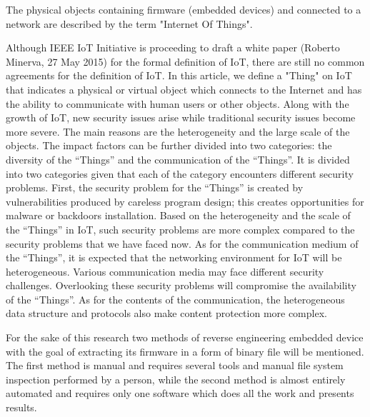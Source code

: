 \documentclass[]{report}
\begin{document}
\begin{center}
The physical objects containing firmware (embedded devices) and connected to a network are described by the term "Internet Of Things".

Although IEEE IoT Initiative is proceeding to draft a white
paper (Roberto Minerva, 27 May 2015) for the formal definition of IoT, there are still no
common agreements for the definition of IoT. In this article,
we define a "Thing" on IoT that indicates a physical or
virtual object which connects to the Internet and has the
ability to communicate with human users or other objects.
Along with the growth of IoT, new security issues arise
while traditional security issues become more severe. The
main reasons are the heterogeneity and the large scale of the
objects. The impact factors can be further divided into two
categories: the diversity of the “Things” and the
communication of the “Things”. It is divided into two
categories given that each of the category encounters
different security problems.
First, the security problem for the “Things” is created by
vulnerabilities produced by careless program design; this
creates opportunities for malware or backdoors installation.
Based on the heterogeneity and the scale of the “Things” in
IoT, such security problems are more complex compared to
the security problems that we have faced now.
As for the communication medium of the “Things”, it is
expected that the networking environment for IoT will be
heterogeneous. Various communication media may face
different security challenges. Overlooking these security
problems will compromise the availability of the “Things”.
As for the contents of the communication, the heterogeneous
data structure and protocols also make content protection more complex.

For the sake of this research two methods of reverse engineering embedded device with the goal of extracting its firmware in a form of binary file will be mentioned. The first method is manual and requires several tools and manual file system inspection performed by a person, while the second method is almost entirely automated and requires only one software which does all the work and presents results.


\end{center}
\end{document}
